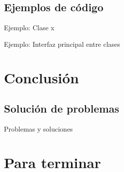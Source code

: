 \documentclass[9pt,xcolor=svgnames]{beamer}
\begin{document}
  
  \subsection{Ejemplos de código}
  
  \begin{frame}{Ejemplo: Clase x}

  \end{frame}
  
  
  \begin{frame}{Ejemplo: Interfaz principal entre clases}

  \end{frame}
    
  


 \section{Conclusión}
 
  \subsection{Solución de problemas}

  \begin{frame}{Problemas y soluciones}
   
  \end{frame}
  
  
 \section{Para terminar}
  

  
\end{document}
